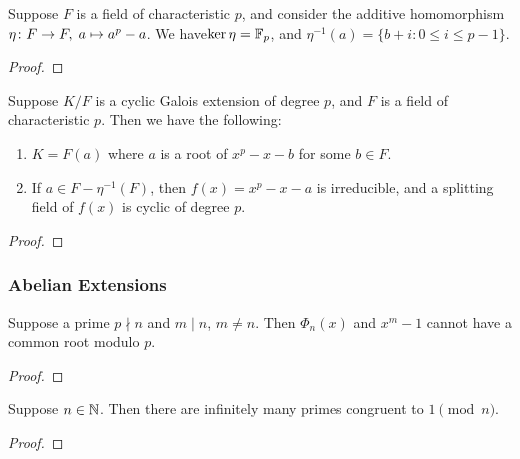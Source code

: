 \begin{proposition}
    Suppose \(F\) is a field of characteristic \(p\),
    and consider the additive homomorphism \(\eta\colon F\to F,\;a\mapsto a^p-a\).
    We have\(\ker\eta = \mathbb{F}_p\), and \(\eta^{-1}(a) = \{b+i : 0 \leq i \leq p-1\}\).
\end{proposition}
\begin{proof}
\end{proof}
\begin{theorem}
    Suppose \(K/F\) is a cyclic Galois extension of degree \(p\),
    and \(F\) is a field of characteristic \(p\).
    Then we have the following:
    \begin{enumerate}[label={(\alph*)}, itemsep=0mm]
        \item \(K = F(a)\) where \(a\) is a root of \(x^p-x-b\) for some \(b \in F\).
        \item If \(a \in F - \eta^{-1}(F)\), then \(f(x) = x^p-x-a\) is irreducible,
            and a splitting field of \(f(x)\) is cyclic of degree \(p\).
    \end{enumerate}
\end{theorem}
\begin{proof}
\end{proof}

\subsubsection*{Abelian Extensions}

\begin{lemma}
    Suppose a prime \(p \nmid n\) and \(m \mid n\), \(m \neq n\).
    Then \(\Phi_n(x)\) and \(x^m - 1\) cannot have a common root modulo \(p\).
\end{lemma}
\begin{proof}
\end{proof}
\begin{theorem}
    Suppose \(n \in \mathbb{N}\).
    Then there are infinitely many primes congruent to \(1 \pmod{n}\).
\end{theorem}
\begin{proof}
\end{proof}

